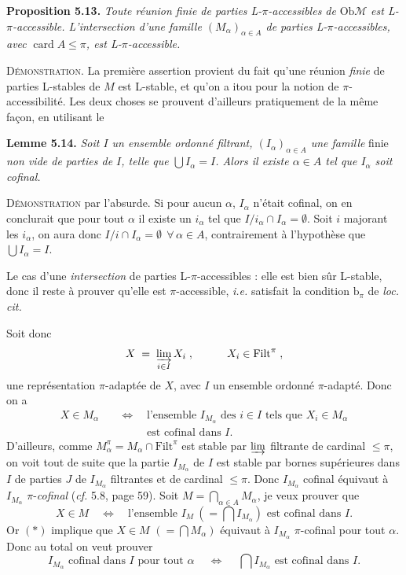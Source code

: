 \documentclass[11pt]{article}
\newcommand{\msp}[1]{\marginpar{\raggedright\footnotesize [#1]}}
\newcommand{\Filt}{\mathrm{Filt}}
\newcommand{\Ob}{\mathrm{Ob}}
\newcommand{\card}{\operatorname{card}}
\begin{document}
\textbf{Proposition 5.13.} \textit{Toute réunion finie de parties L-$\pi$-accessibles de} $\Ob\mathcal{M}$ \textit{est L-$\pi$-accessible. L'intersection d'une famille $(M_{\alpha})_{\alpha\in A}$ de parties L-$\pi$-accessibles, avec} $\card A \leq \pi$\textit{, est L-$\pi$-accessible.}

\textsc{Démonstration}. La première assertion provient du fait qu'une réunion \textit{finie} de parties L-stables de $M$ est L-stable, et qu'on a itou pour la notion de $\pi$-accessibilité. Les deux choses se prouvent d'ailleurs pratiquement de la même façon, en utilisant le

\textbf{Lemme 5.14.} \textit{Soit $I$ un ensemble ordonné filtrant, $(I_{\alpha})_{\alpha\in A}$ une famille} finie \textit{non vide de parties de $I$, telle que $\bigcup I_{\alpha} = I$. Alors il existe $\alpha \in A$ tel que $I_{\alpha}$ soit cofinal.}

\msp{page 68}
\textsc{Démonstration} par l'absurde. Si pour aucun $\alpha$, $I_{\alpha}$ n'était cofinal, on en conclurait que pour tout $\alpha$ il existe un $i_{\alpha}$ tel que $I/i_{\alpha} \cap I_{\alpha} = \emptyset$. Soit $i$ majorant les $i_{\alpha}$, on aura donc $I/i \cap I_{\alpha} = \emptyset \ \ \forall\, \alpha \in A$, contrairement à l'hypothèse que $\bigcup I_{\alpha} = I$.

Le cas d'une \textit{intersection} de parties L-$\pi$-accessibles : elle est bien sûr L-stable, donc il reste à prouver qu'elle est $\pi$-accessible, \textit{i.e.} satisfait la condition $\mathrm{b}_{\pi}$ de \textit{loc. cit.}

\msp{page 69}
Soit donc
\[
X \;=\; \varinjlim_{i\in I} X_{i} \; , \qquad\quad X_{i} \in \Filt^{\pi} \; ,
\]
une représentation $\pi$-adaptée de $X$, avec $I$ un ensemble ordonné $\pi$-adapté. Donc on a
\[
\begin{aligned}
X \in M_{\alpha} \quad &\Longleftrightarrow \quad \text{l'ensemble } I_{M_{\alpha}} \text{ des } i \in I \text{ tels que } X_{i} \in M_{\alpha}\\
&\phantom{\Longleftrightarrow} \quad \text{est cofinal dans } I.
\end{aligned}
\tag*{$(*)$}
\]
D'ailleurs, comme $M_{\alpha}^{\pi} = M_{\alpha} \cap \Filt^{\pi}$ est stable par $\varinjlim$ filtrante de cardinal $\leq \pi$, on voit tout de suite que la partie $I_{M_{\alpha}}$ de $I$ est stable par bornes supérieures dans $I$ de parties $J$ de $I_{M_{\alpha}}$ filtrantes et de cardinal $\leq \pi$. Donc $I_{M_{\alpha}}$ cofinal équivaut à $I_{M_{\alpha}}$ $\pi$-\textit{cofinal} (\textit{cf.} 5.8, page 59). Soit $M = \bigcap_{\alpha\in A} M_{\alpha}$, je veux prouver que
\[
X \in M \quad \Longleftrightarrow \quad \text{l'ensemble } I_{M} \ (= \textstyle\bigcap I_{M_{\alpha}}) \text{ est cofinal dans } I.
\tag*{$(**)$}
\]
Or $(*)$ implique que $X \in M$ $(= \bigcap M_{\alpha})$ équivaut à $I_{M_{\alpha}}$ $\pi$-cofinal pour tout $\alpha$. Donc au total on veut prouver
\[
I_{M_{\alpha}} \text{ cofinal dans } I \text{ pour tout } \alpha \quad\ \Longleftrightarrow \quad\ \textstyle\bigcap I_{M_{\alpha}} \text{ est cofinal dans } I.
\tag*{$(***)$}
\]
\end{document}
